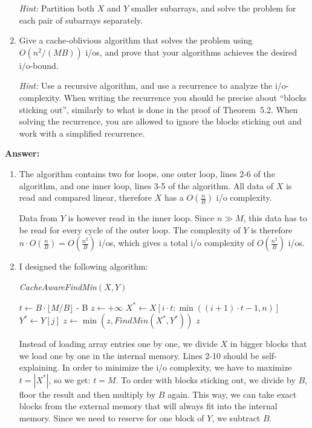 \documentclass{article}
\newcommand{\io}{{\sc i/o}\xspace}
\newcommand{\ios}{{\io}s\xspace}
\newcounter{rcounter}
\newenvironment{rlist}%
{\begin{list}{\setnr-\arabic{rcounter}}{\usecounter{rcounter}}}{\end{list}}
\begin{document}
\begin{rlist}
\begin{enumerate}
            \emph{Hint:} Partition both $X$ and $Y$ smaller subarrays, and solve the problem for each pair of subarrays separately.
            \item[(iii)]
            Give a cache-oblivious algorithm that solves the problem using $O(n^2/(MB))$ \ios, and prove that your algorithms achieves the desired \io-bound.
            
            \emph{Hint:} Use a recursive algorithm, and use a recurrence to analyze the \io-complexity. When writing the recurrence you should be precise about ``blocks sticking out'', similarly to what is done in the proof of Theorem~5.2. When solving the recurrence, you are allowed to ignore the blocks sticking out and work with a simplified recurrence.
        \end{enumerate}
        
        \textbf{Answer:}
        \begin{enumerate}
            \item[(i)]
            The algorithm contains two for loops, one outer loop, lines 2-6 of the algorithm, and one inner loop, lines 3-5 of the algorithm. All data of $X$ is read and compared linear, therefore $X$ has a $O(\frac{n}{B})$ \io complexity.
            
            Data from $Y$ is however read in the inner loop. Since $n \gg M$, this data has to be read for every cycle of the outer loop. The complexity of $Y$ is therefore $n \cdot O(\frac{n}{B}) = O(\frac{n^2}{B})$ \ios, which gives a total \io complexity of $O(\frac{n^2}{B})$ \ios.
            \item[(ii)]
            I designed the following algorithm:
            
            \emph{CacheAwareFindMin}$(X,Y)$
            \begin{algorithmic}[1]
                \State $t \gets B \cdot \lfloor M / B \rfloor$ - B
                \State $z \gets +\infty$
                \State $X^* \gets X[i \cdot t : \min ((i+1) \cdot t - 1, n)]$
                \State $Y^* \gets Y[j]$
                \State $z \gets \min (z, FindMin(X^*, Y^*))$
                \EndFor
                \EndFor
                \State \Return $z$
            \end{algorithmic}
            
            Instead of loading array entries one by one, we divide $X$ in bigger blocks that we load one by one in the internal memory. Lines 2-10 should be self-explaining. In order to minimize the \io complexity, we have to maximize $t = |X^*|$, so we get: $t = M$. To order with blocks sticking out, we divide by $B$, floor the result and then multiply by $B$ again. This way, we can take exact blocks from the external memory that will always fit into the internal memory. Since we need to reserve for one block of $Y$, we subtract $B$. 
            

\end{enumerate}
\end{rlist}
\end{document}
